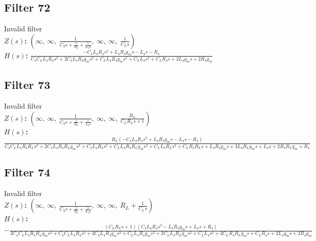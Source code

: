\documentclass{article}
\begin{document}
\subsection*{Filter 72}
Invalid filter \\ 
\textbf{$Z(s)$:} $\left( \infty, \  \infty, \  \frac{1}{C_{3} s + \frac{1}{R_{3}} + \frac{1}{L_{3} s}}, \  \infty, \  \infty, \  \frac{1}{C_{L} s}\right)$ \\ 
\textbf{$H(s)$:} $\frac{- C_{4} L_{4} R_{4} s^{2} + L_{4} R_{4} g_{m} s - L_{4} s - R_{4}}{C_{4} C_{L} L_{4} R_{4} s^{3} + 2 C_{4} L_{4} R_{4} g_{m} s^{2} + C_{L} L_{4} R_{4} g_{m} s^{2} + C_{L} L_{4} s^{2} + C_{L} R_{4} s + 2 L_{4} g_{m} s + 2 R_{4} g_{m}}$ \\ 
\subsection*{Filter 73}
Invalid filter \\ 
\textbf{$Z(s)$:} $\left( \infty, \  \infty, \  \frac{1}{C_{3} s + \frac{1}{R_{3}} + \frac{1}{L_{3} s}}, \  \infty, \  \infty, \  \frac{R_{L}}{C_{L} R_{L} s + 1}\right)$ \\ 
\textbf{$H(s)$:} $\frac{R_{L} \left(- C_{4} L_{4} R_{4} s^{2} + L_{4} R_{4} g_{m} s - L_{4} s - R_{4}\right)}{C_{4} C_{L} L_{4} R_{4} R_{L} s^{3} + 2 C_{4} L_{4} R_{4} R_{L} g_{m} s^{2} + C_{4} L_{4} R_{4} s^{2} + C_{L} L_{4} R_{4} R_{L} g_{m} s^{2} + C_{L} L_{4} R_{L} s^{2} + C_{L} R_{4} R_{L} s + L_{4} R_{4} g_{m} s + 2 L_{4} R_{L} g_{m} s + L_{4} s + 2 R_{4} R_{L} g_{m} + R_{4}}$ \\ 
\subsection*{Filter 74}
Invalid filter \\ 
\textbf{$Z(s)$:} $\left( \infty, \  \infty, \  \frac{1}{C_{3} s + \frac{1}{R_{3}} + \frac{1}{L_{3} s}}, \  \infty, \  \infty, \  R_{L} + \frac{1}{C_{L} s}\right)$ \\ 
\textbf{$H(s)$:} $- \frac{\left(C_{L} R_{L} s + 1\right) \left(C_{4} L_{4} R_{4} s^{2} - L_{4} R_{4} g_{m} s + L_{4} s + R_{4}\right)}{2 C_{4} C_{L} L_{4} R_{4} R_{L} g_{m} s^{3} + C_{4} C_{L} L_{4} R_{4} s^{3} + 2 C_{4} L_{4} R_{4} g_{m} s^{2} + C_{L} L_{4} R_{4} g_{m} s^{2} + 2 C_{L} L_{4} R_{L} g_{m} s^{2} + C_{L} L_{4} s^{2} + 2 C_{L} R_{4} R_{L} g_{m} s + C_{L} R_{4} s + 2 L_{4} g_{m} s + 2 R_{4} g_{m}}$ \\ 
\end{document}
